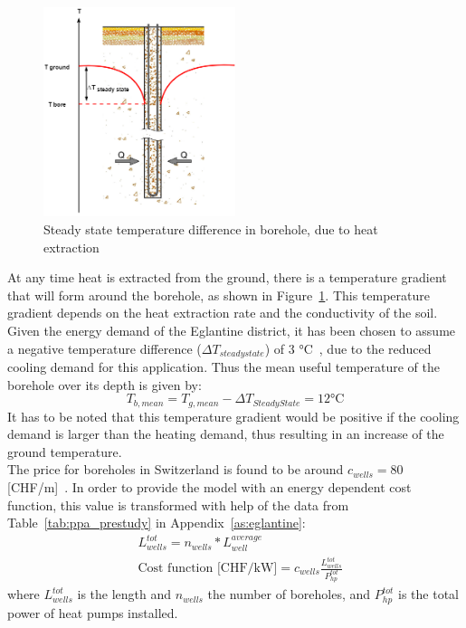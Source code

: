 \documentclass{article}
\begin{document}
\begin{figure}[htp]
	\centering
	\includegraphics[width=0.5\textwidth]{GTW_T_profile.png}
	\caption{Steady state temperature difference in borehole, due to heat extraction}
	\label{fig:GTW_T}
\end{figure}

At any time heat is extracted from the ground, there is a temperature gradient that will form around the borehole, as shown in Figure~\ref{fig:GTW_T}. This temperature gradient depends on the heat extraction rate and the conductivity of the soil. Given the energy demand of the Eglantine district, it has been chosen to assume a negative temperature difference ($\Delta T_{steady state}$) of 3 \si{\celsius}~\cite{guoTechnoeconomicComparisonDirect2012,hanSensitivityAnalysisVertical2016}, due to the reduced cooling demand for this application. Thus the mean useful temperature of the borehole over its depth is given by:
\begin{equation}
	T_{b, mean} = T_{g, mean} -\Delta T_{Steady State} = 12 \si{\celsius}
\end{equation}
It has to be noted that this temperature gradient would be positive if the cooling demand is larger than the heating demand, thus resulting in an increase of the ground temperature.\\

The price for boreholes in Switzerland is found to be around $c_{wells} = 80$ [CHF/m]~\cite{bawos.chMitErdsondenbohrungenKosten2018}. 
In order to provide the model with an energy dependent cost function, this value is transformed with help of the data from Table~\ref{tab:ppa_prestudy} in Appendix~\ref{as:eglantine}:
\begin{align}
&  L_{wells}^{tot} = n_{wells} * L_{well}^{average} \\
& 	\text{Cost function [CHF/kW]} = c_{wells} \frac{L_{wells}^{tot}}{P_{hp}^{tot}}
\end{align}
where $L_{wells}^{tot}$ is the length and $n_{wells}$ the number of boreholes, and $P_{hp}^{tot}$ is the total power of heat pumps installed. 
\end{document}
